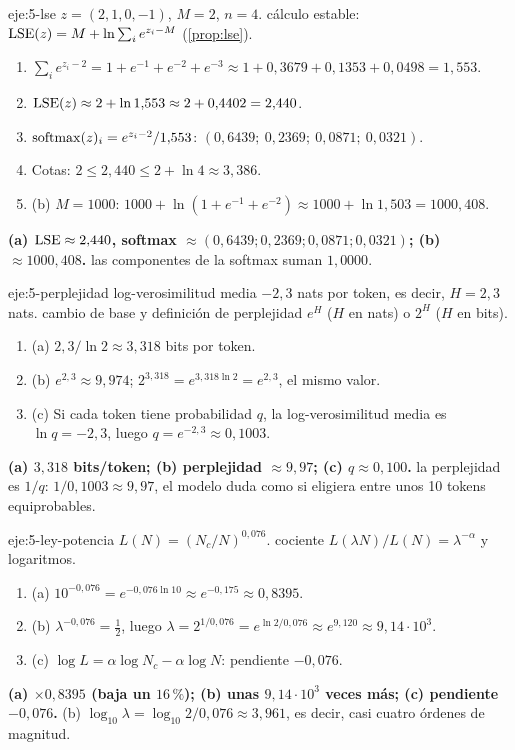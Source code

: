 \begin{solucion}{eje:5-lse}
\datos $z=(2,1,0,-1)$, $M=2$, $n=4$.
\planteamiento cálculo estable: $\operatorname{LSE}(z)=M+\ln\sum_ie^{z_i-M}$ (\cref{prop:lse}).
\pasos
\begin{enumerate}[label=\arabic*.]
  \item $\sum_ie^{z_i-2}=1+e^{-1}+e^{-2}+e^{-3}\approx1+0{,}3679+0{,}1353+0{,}0498=1{,}553$.
  \item $\operatorname{LSE}(z)\approx2+\ln1{,}553\approx2+0{,}4402=2{,}440$.
  \item $\operatorname{softmax}(z)_i=e^{z_i-2}/1{,}553$: $(0{,}6439;\ 0{,}2369;\ 0{,}0871;\ 0{,}0321)$.
  \item Cotas: $2\le2{,}440\le2+\ln4\approx3{,}386$.
  \item (b) $M=1000$: $1000+\ln(1+e^{-1}+e^{-2})\approx1000+\ln1{,}503=1000{,}408$.
\end{enumerate}
\resultado \textbf{(a) $\operatorname{LSE}\approx2{,}440$, softmax $\approx(0{,}6439;0{,}2369;0{,}0871;0{,}0321)$; (b) $\approx1000{,}408$.}
\comprobacion las componentes de la softmax suman $1{,}0000$.
\end{solucion}

\begin{solucion}{eje:5-perplejidad}
\datos log-verosimilitud media $-2{,}3$ nats por token, es decir, $H=2{,}3$ nats.
\planteamiento cambio de base y definición de perplejidad $e^{H}$ ($H$ en nats) o $2^{H}$ ($H$ en bits).
\pasos
\begin{enumerate}[label=\arabic*.]
  \item (a) $2{,}3/\ln2\approx3{,}318$ bits por token.
  \item (b) $e^{2{,}3}\approx9{,}974$; $2^{3{,}318}=e^{3{,}318\ln2}=e^{2{,}3}$, el mismo valor.
  \item (c) Si cada token tiene probabilidad $q$, la log-verosimilitud media es $\ln q=-2{,}3$, luego $q=e^{-2{,}3}\approx0{,}1003$.
\end{enumerate}
\resultado \textbf{(a) $3{,}318$ bits/token; (b) perplejidad $\approx9{,}97$; (c) $q\approx0{,}100$.}
\comprobacion la perplejidad es $1/q$: $1/0{,}1003\approx9{,}97$, el modelo duda como si eligiera entre unos 10 tokens equiprobables.
\end{solucion}

\begin{solucion}{eje:5-ley-potencia}
\datos $L(N)=(N_c/N)^{0{,}076}$.
\planteamiento cociente $L(\lambda N)/L(N)=\lambda^{-\alpha}$ y logaritmos.
\pasos
\begin{enumerate}[label=\arabic*.]
  \item (a) $10^{-0{,}076}=e^{-0{,}076\ln10}\approx e^{-0{,}175}\approx0{,}8395$.
  \item (b) $\lambda^{-0{,}076}=\frac12$, luego $\lambda=2^{1/0{,}076}=e^{\ln2/0{,}076}\approx e^{9{,}120}\approx9{,}14\cdot10^3$.
  \item (c) $\log L=\alpha\log N_c-\alpha\log N$: pendiente $-0{,}076$.
\end{enumerate}
\resultado \textbf{(a) $\times0{,}8395$ (baja un $16\,\%$); (b) unas $9{,}14\cdot10^3$ veces más; (c) pendiente $-0{,}076$.}
\comprobacion (b) $\log_{10}\lambda=\log_{10}2/0{,}076\approx3{,}961$, es decir, casi cuatro órdenes de magnitud.
\end{solucion}

